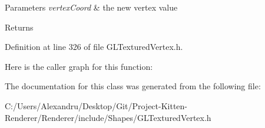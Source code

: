 \begin{DoxyParams}{Parameters}
{\em vertex\+Coord} & the new vertex value \\
\hline
\end{DoxyParams}
\begin{DoxyReturn}{Returns}

\end{DoxyReturn}


Definition at line 326 of file G\+L\+Textured\+Vertex.\+h.



Here is the caller graph for this function\+:




The documentation for this class was generated from the following file\+:\begin{DoxyCompactItemize}
\item 
C\+:/\+Users/\+Alexandru/\+Desktop/\+Git/\+Project-\/\+Kitten-\/\+Renderer/\+Renderer/include/\+Shapes/G\+L\+Textured\+Vertex.\+h\end{DoxyCompactItemize}
